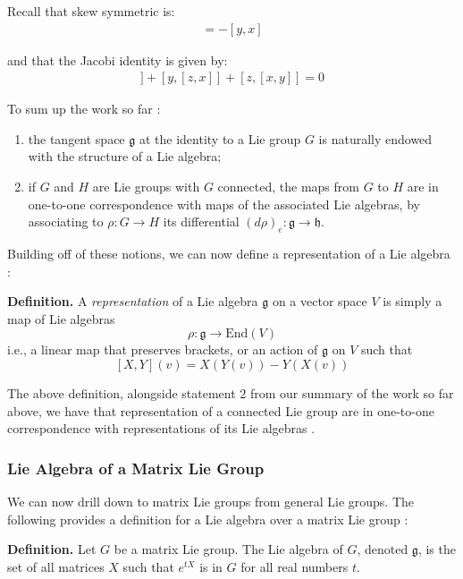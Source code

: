 \documentclass[11pt, a4paper, oneside]{article}
\theoremstyle{plain}
\theoremstyle{definition}
\theoremstyle{example}
\def\End{\mathrm{End}}
\begin{document}
\par
Recall that skew symmetric is:
\begin{align*}
[x,y] = -[y,x]
\end{align*}

and that the Jacobi identity is given by:
\begin{align*}
[x, [y,z]] + [y,[z,x]] + [z,[x,y]] = 0
\end{align*}

To sum up the work so far \cite[\S 8.1]{fulton}:
\begin{enumerate}
\item the tangent space $\mathfrak{g}$ at the identity to a Lie group $G$ is naturally endowed with the structure of a Lie algebra;
\item if $G$ and $H$ are Lie groups with $G$ connected, the maps from $G$ to $H$ are in one-to-one correspondence with maps of the associated Lie algebras, by associating to $\rho: G \to H$ its differential $(d\rho)_e: \mathfrak{g} \to \mathfrak{h}$.
\end{enumerate}

Building off of these notions, we can now define a representation of a Lie algebra \cite[\S 8.1]{fulton}:

\par
\textbf{Definition.} A \textit{representation} of a Lie algebra $\mathfrak{g}$ on a vector space $V$ is simply a map of Lie algebras $$\rho: \mathfrak{g} \to \End(V)$$ i.e., a linear map that preserves brackets, or an action of $\mathfrak{g}$ on $V$ such that $$[X, Y](v) = X(Y(v)) - Y(X(v))$$

The above definition, alongside statement $2$ from our summary of the work so far above, we have that representation of a connected Lie group are in one-to-one correspondence with representations of its Lie algebras \cite[\S 8.1]{fulton}.


\subsubsection{Lie Algebra of a Matrix Lie Group}

We can now drill down to matrix Lie groups from general Lie groups. The following provides a definition for a Lie algebra over a matrix Lie group \cite[\S 3.3, Definition 3.18]{hall}:

\par
\textbf{Definition.} Let $G$ be a matrix Lie group. The Lie algebra of $G$, denoted $\mathfrak{g}$, is the set of all matrices $X$ such that $e^{tX}$ is in $G$ for all real numbers $t$.
\end{document}
